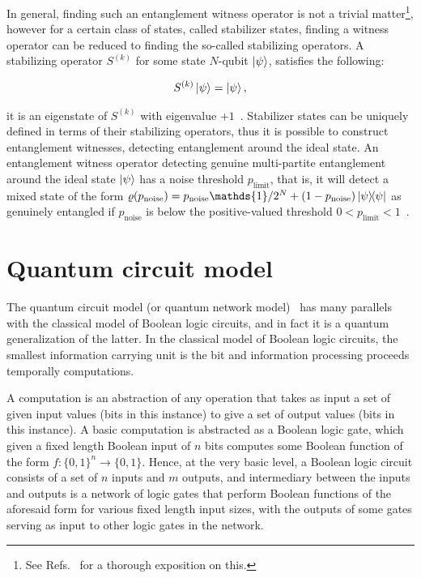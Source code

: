 \noindent
In general, finding such an entanglement witness operator is not a trivial matter\footnote{See Refs.~\cite{Gurvits_2003,Gharibian_2010} for a thorough exposition on this.}, however for a certain class of states, called stabilizer states, finding a witness operator can be reduced to finding the so-called stabilizing operators. A stabilizing operator $S^{(k)}$ for some state $N$-qubit $\ket{\psi}$, satisfies the following:

\begin{align}
	S^{(k)}\ket{\psi} = \ket{\psi},
\end{align}

\noindent
\ie it is an eigenstate of $S^{(k)}$ with eigenvalue $+1$~\cite{Toth_2005}. Stabilizer states can be uniquely defined in terms of their stabilizing operators, thus it is possible to construct entanglement witnesses, detecting entanglement around the ideal state. An entanglement witness operator detecting genuine multi-partite entanglement around the ideal state $\ket{\psi}$ has a noise threshold $p_\text{limit}$, that is, it will detect a mixed state of the form $\varrho(p_\text{noise}) = p_\text{noise}\mathds{1}/2^N + (1- p_\text{noise})\op{\psi}$ as genuinely entangled if $p_\text{noise}$ is below the positive-valued threshold $0<p_\text{limit}<1$~\cite{Toth_2005}. 


\section{Quantum circuit model}
The quantum circuit model (or quantum network model)~\cite{Deutsch_1989} has many parallels with the classical model of Boolean logic circuits, and in fact it is a quantum generalization of the latter. In the classical model of Boolean logic circuits, the smallest information carrying unit is the bit and information processing proceeds temporally \via computations.

\clearpage
\noindent
A computation is an abstraction of any operation that takes as input a set of given input values (bits in this instance) to give a set of output values (bits in this instance). A basic  computation is abstracted as a Boolean logic gate, which given a fixed length Boolean input of $n$ bits computes some Boolean function of the form $f: \{0,1\}^{n} \to \{0,1\}$. Hence, at the very basic level, a Boolean logic circuit consists of a set of $n$ inputs and $m$ outputs, and intermediary between the inputs and outputs is a network of logic gates that perform Boolean functions of the aforesaid form for various fixed length input sizes, with the outputs of some gates serving as input to other logic gates in the network.


